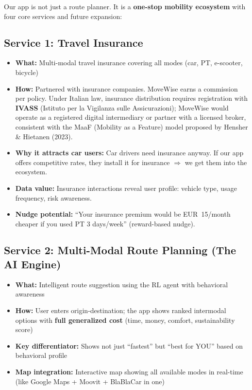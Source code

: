 \documentclass[11pt,a4paper]{article}
\begin{document}
\begin{tcolorbox}[colback=lightpurple,colframe=deeppurple,title=\textbf{MoveWise Service Portfolio}]
Our app is not just a route planner. It is a \textbf{one-stop mobility ecosystem} with four core services and future expansion:
\end{tcolorbox}

\subsection{Service 1: Travel Insurance}

\begin{itemize}[noitemsep]
    \item \textbf{What:} Multi-modal travel insurance covering all modes (car, PT, e-scooter, bicycle)
    \item \textbf{How:} Partnered with insurance companies. MoveWise earns a commission per policy. Under Italian law, insurance distribution requires registration with \textbf{IVASS} (Istituto per la Vigilanza sulle Assicurazioni); MoveWise would operate as a registered digital intermediary or partner with a licensed broker, consistent with the MaaF (Mobility as a Feature) model proposed by Hensher \& Hietanen (2023).
    \item \textbf{Why it attracts car users:} Car drivers need insurance anyway. If our app offers competitive rates, they install it for insurance $\Rightarrow$ we get them into the ecosystem.
    \item \textbf{Data value:} Insurance interactions reveal user profile: vehicle type, usage frequency, risk awareness.
    \item \textbf{Nudge potential:} ``Your insurance premium would be EUR~15/month cheaper if you used PT 3 days/week'' (reward-based nudge).
\end{itemize}

\subsection{Service 2: Multi-Modal Route Planning (The AI Engine)}

\begin{itemize}[noitemsep]
    \item \textbf{What:} Intelligent route suggestion using the RL agent with behavioral awareness
    \item \textbf{How:} User enters origin-destination; the app shows ranked intermodal options with \textbf{full generalized cost} (time, money, comfort, sustainability score)
    \item \textbf{Key differentiator:} Shows not just ``fastest'' but ``best for YOU'' based on behavioral profile
    \item \textbf{Map integration:} Interactive map showing all available modes in real-time (like Google Maps + Moovit + BlaBlaCar in one)
\end{itemize}
\end{document}
